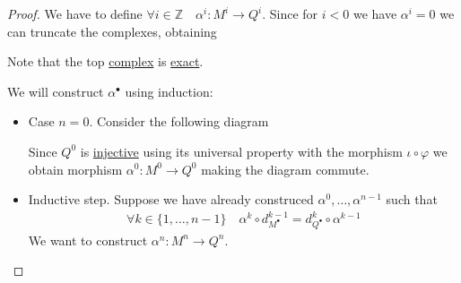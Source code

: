 \documentclass[../../../main]{subfiles}
\begin{document}
\begin{proof}
  We have to define \(\forall i \in \mathbb{Z} \quad \alpha^{i}: M^{i} \to Q^{i}\).
  Since for \(i < 0\) we have \(\alpha^{i} = 0\) we can truncate the complexes, obtaining
  \begin{center}
  \end{center}
  Note that the top \hyperref[def:complex]{complex} is \hyperref[def:exact-complex]{exact}.

  We will construct \(\alpha^{\bullet}\) using induction:
  \begin{itemize}
    \item Case \(n = 0\). Consider the following diagram
          \begin{center}
          \end{center}
          Since \(Q^{0}\) is \hyperref[def:injective-projective-object]{injective} using its universal property with the morphism \(\iota \circ \varphi\) we obtain morphism \(\alpha^{0}: M^{0} \to Q^{0}\) making the diagram commute.
    \item Inductive step. Suppose we have already construced \(\alpha^{0}, \ldots, \alpha^{n-1}\) such that
          \begin{align*}
            \forall k \in \{1, \ldots, n-1\} \quad \alpha^{k} \circ d_{M^{\bullet}}^{k-1} = d_{Q^{\bullet}}^{k} \circ \alpha^{k-1}
          \end{align*}
          We want to construct \(\alpha^{n}: M^{n} \to Q^{n}\).


\end{itemize}
\end{proof}
\end{document}
